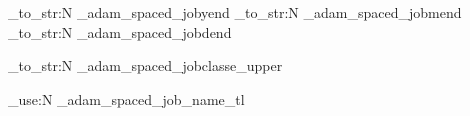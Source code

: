 \NewDocumentCommand{\docendyear}{}
 { \tl_to_str:N \g_adam_spaced_jobyend}
\NewDocumentCommand{\docendmonth}{}
 { \tl_to_str:N \g_adam_spaced_jobmend}
\NewDocumentCommand{\docendday}{}
 { \tl_to_str:N \g_adam_spaced_jobdend}

\NewDocumentCommand{\docclasseupper}{}
 {
  \tl_to_str:N \g_adam_spaced_jobclasse_upper
 }

\NewDocumentCommand{\spacedfilename}{}
 {
  \tl_use:N \g_adam_spaced_job_name_tl
 }
\ExplSyntaxOff
